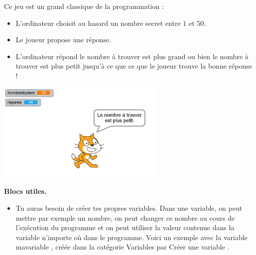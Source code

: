 \documentclass[class=report,crop=false, 12pt]{standalone}
\begin{document}





\bigskip
\bigskip


\begin{activite}
Ce jeu est un grand classique de la programmation :
\begin{itemize}
  \item L'ordinateur choisit au hasard un nombre secret entre $1$ et $50$.
  \item Le joueur propose une réponse.  
  \item L'ordinateur répond \og le nombre à trouver est plus grand \fg{} ou bien \og le nombre à trouver est plus petit \fg{} jusqu'à ce que ce que le joueur trouve la bonne réponse !
\end{itemize}

\begin{center}
  \includegraphics[width=0.6\textwidth]{ecran-06-ex1} 
\end{center}


\bigskip

\textbf{Blocs utiles.}

\begin{itemize}
  \item Tu auras besoin de créer tes propres variables. Dans une variable, on peut mettre par exemple un nombre, on peut changer ce nombre au cours de l'exécution du programme et on peut utiliser la valeur contenue dans la variable n'importe où dans le programme. Voici un exemple avec la variable \og mavariable \fg{}, créée dans la catégorie \og Variables \fg{} par \og Créer une variable \fg{}.

\begin{center}
  \qquad\qquad
\begin{scratch}
\end{scratch}
\end{center} 


\end{itemize}
\end{activite}
\end{document}
